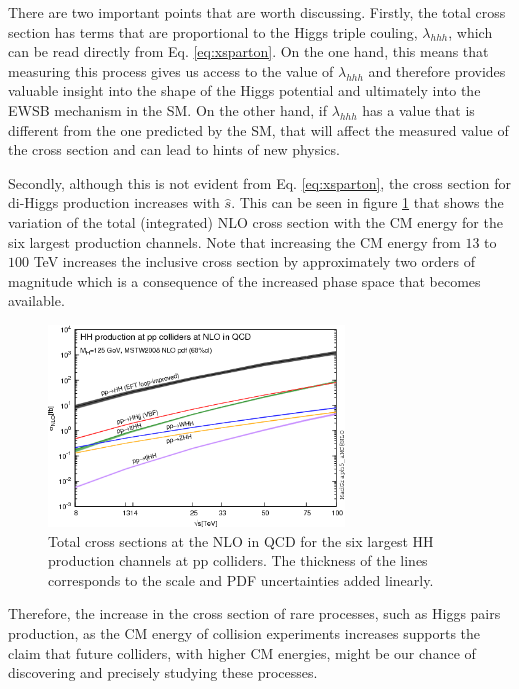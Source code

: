 There are two important points that are worth discussing. Firstly, the total cross section has terms that are proportional to the Higgs triple couling, $\lambda_{hhh}$, which can be read directly from Eq. \ref{eq:xsparton}. On the one hand, this means that measuring this process gives us access to the value of $\lambda_{hhh}$ and therefore provides valuable insight into the shape of the Higgs potential and ultimately into the EWSB mechanism in the SM. On the other hand, if $\lambda_{hhh}$ has a value that is different from the one predicted by the SM, that will affect the measured value of the cross section and can lead to hints of new physics. 

Secondly, although this is not evident from Eq. \ref{eq:xsparton}, the cross section for di-Higgs production increases with $\hat{s}$. This can be seen in figure \ref{fig:HHxs_s} that shows the variation of the total (integrated) NLO cross section with the CM energy for the six largest production channels. Note that increasing the CM energy from $13$ to $100$ TeV increases the inclusive cross section by approximately two orders of magnitude which is a consequence of the increased phase space that becomes available.

\begin{figure}[]
	\centering
	\includegraphics[width=0.7\textwidth]{./Figures/HH-xsec.png}
	\caption{Total cross sections at the NLO in QCD for the six largest HH production channels at pp colliders. The thickness of the lines corresponds to the scale and PDF uncertainties added linearly.}
	\label{fig:HHxs_s}
\end{figure}

Therefore, the increase in the cross section of rare processes, such as Higgs pairs production, as the CM energy of collision experiments increases supports the claim that future colliders, with higher CM energies, might be our chance of discovering and precisely studying these processes.

